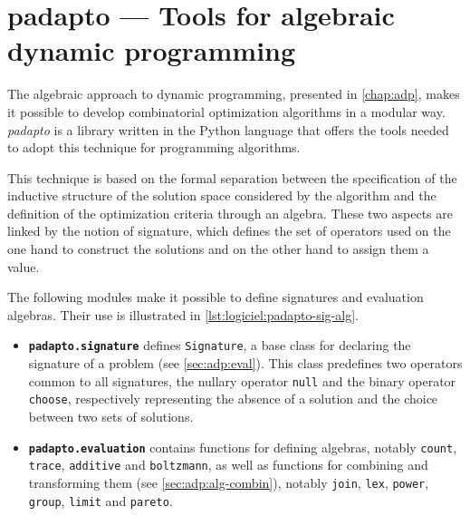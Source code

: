 \section{padapto --- Tools for algebraic dynamic programming}

The algebraic approach to dynamic programming, presented in \cref{chap:adp}, makes it possible to develop combinatorial optimization algorithms in a modular way.
\emph{padapto} is a library written in the Python language that offers the tools needed to adopt this technique for programming algorithms.

This technique is based on the formal separation between the specification of the inductive structure of the solution space considered by the algorithm and the definition of the optimization criteria through an algebra.
These two aspects are linked by the notion of signature, which defines the set of operators used on the one hand to construct the solutions and on the other hand to assign them a value.

The following modules make it possible to define signatures and evaluation algebras.
Their use is illustrated in \cref{lst:logiciel:padapto-sig-alg}.
\begin{itemize}
    \item \textbf{\texttt{padapto.signature}} defines \texttt{Signature}, a base class for declaring the signature of a problem (see \cref{sec:adp:eval}).
        This class predefines two operators common to all signatures, the nullary operator \texttt{null} and the binary operator \texttt{choose}, respectively representing the absence of a solution and the choice between two sets of solutions.
    \item \textbf{\texttt{padapto.evaluation}} contains functions for defining algebras, notably \texttt{count}, \texttt{trace}, \texttt{additive} and \texttt{boltzmann}, as well as functions for combining and transforming them (see \cref{sec:adp:alg-combin}), notably \texttt{join}, \texttt{lex}, \texttt{power}, \texttt{group}, \texttt{limit} and \texttt{pareto}.
\end{itemize}

